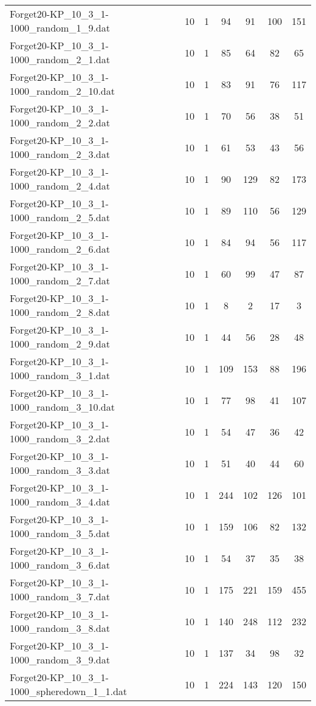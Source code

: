 \begin{table}[!ht]
\begin{tabular}{lcccccc}
Forget20-KP\_10\_3\_1-1000\_random\_1\_9.dat & 10 & 1 & 94 & 91 & 100 & 151 \\
Forget20-KP\_10\_3\_1-1000\_random\_2\_1.dat & 10 & 1 & 85 & 64 & 82 & 65 \\
Forget20-KP\_10\_3\_1-1000\_random\_2\_10.dat & 10 & 1 & 83 & 91 & 76 & 117 \\
Forget20-KP\_10\_3\_1-1000\_random\_2\_2.dat & 10 & 1 & 70 & 56 & 38 & 51 \\
Forget20-KP\_10\_3\_1-1000\_random\_2\_3.dat & 10 & 1 & 61 & 53 & 43 & 56 \\
Forget20-KP\_10\_3\_1-1000\_random\_2\_4.dat & 10 & 1 & 90 & 129 & 82 & 173 \\
Forget20-KP\_10\_3\_1-1000\_random\_2\_5.dat & 10 & 1 & 89 & 110 & 56 & 129 \\
Forget20-KP\_10\_3\_1-1000\_random\_2\_6.dat & 10 & 1 & 84 & 94 & 56 & 117 \\
Forget20-KP\_10\_3\_1-1000\_random\_2\_7.dat & 10 & 1 & 60 & 99 & 47 & 87 \\
Forget20-KP\_10\_3\_1-1000\_random\_2\_8.dat & 10 & 1 & 8 & 2 & 17 & 3 \\
Forget20-KP\_10\_3\_1-1000\_random\_2\_9.dat & 10 & 1 & 44 & 56 & 28 & 48 \\
Forget20-KP\_10\_3\_1-1000\_random\_3\_1.dat & 10 & 1 & 109 & 153 & 88 & 196 \\
Forget20-KP\_10\_3\_1-1000\_random\_3\_10.dat & 10 & 1 & 77 & 98 & 41 & 107 \\
Forget20-KP\_10\_3\_1-1000\_random\_3\_2.dat & 10 & 1 & 54 & 47 & 36 & 42 \\
Forget20-KP\_10\_3\_1-1000\_random\_3\_3.dat & 10 & 1 & 51 & 40 & 44 & 60 \\
Forget20-KP\_10\_3\_1-1000\_random\_3\_4.dat & 10 & 1 & 244 & 102 & 126 & 101 \\
Forget20-KP\_10\_3\_1-1000\_random\_3\_5.dat & 10 & 1 & 159 & 106 & 82 & 132 \\
Forget20-KP\_10\_3\_1-1000\_random\_3\_6.dat & 10 & 1 & 54 & 37 & 35 & 38 \\
Forget20-KP\_10\_3\_1-1000\_random\_3\_7.dat & 10 & 1 & 175 & 221 & 159 & 455 \\
Forget20-KP\_10\_3\_1-1000\_random\_3\_8.dat & 10 & 1 & 140 & 248 & 112 & 232 \\
Forget20-KP\_10\_3\_1-1000\_random\_3\_9.dat & 10 & 1 & 137 & 34 & 98 & 32 \\
Forget20-KP\_10\_3\_1-1000\_spheredown\_1\_1.dat & 10 & 1 & 224 & 143 & 120 & 150 \\

\end{tabular}
\end{table}
